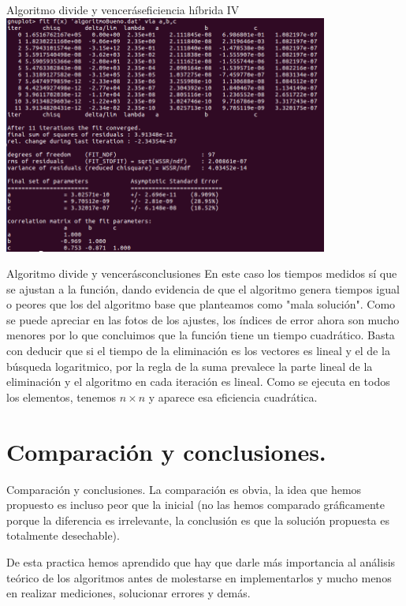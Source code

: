 \documentclass{beamer}
\begin{document}
\begin{frame}{Algoritmo divide y vencerás}{eficiencia híbrida IV}
	\includegraphics[width=0.8\textwidth]{dyvajuste2.png}
\end{frame}
\begin{frame}{Algoritmo divide y vencerás}{conclusiones}
En este caso los tiempos medidos sí que se ajustan a la función, dando evidencia de que el algoritmo genera tiempos igual o peores que los del algoritmo base que planteamos como "mala solución". Como se puede apreciar en las fotos de los ajustes, los índices de error ahora son mucho menores por lo que concluimos que la función tiene un tiempo cuadrático. Basta con deducir que si el tiempo de la eliminación es los vectores es lineal y el de la búsqueda logaritmico, por la regla de la suma prevalece la parte lineal de la eliminación y el algoritmo en cada iteración es lineal. Como se ejecuta en todos los elementos, tenemos $n\times n$ y aparece esa eficiencia cuadrática.
\end{frame}
\section{Comparación y conclusiones.}
	
\begin{frame}{Comparación y conclusiones.}
		La comparación es obvia, la idea que hemos propuesto es incluso peor que la inicial (no las hemos comparado gráficamente porque la diferencia es irrelevante, la conclusión es que la solución propuesta es totalmente desechable).
		
		De esta practica hemos aprendido que hay que darle más importancia al análisis teórico de los algoritmos antes de molestarse en implementarlos y mucho menos en realizar mediciones, solucionar errores y demás.

\end{frame}
\end{document}
